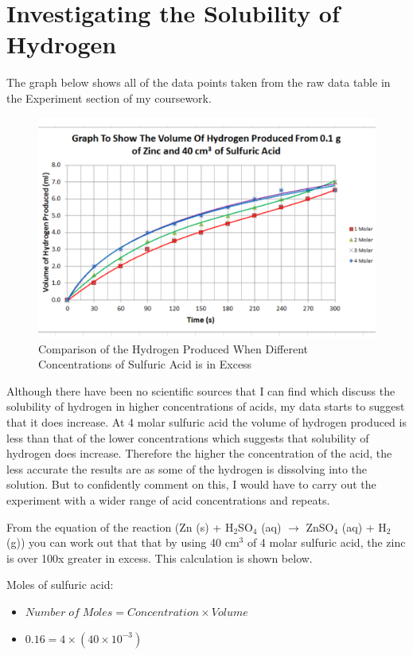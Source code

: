 \section{Investigating the Solubility of Hydrogen} 

The graph below shows all of the data points taken from the raw data table in the Experiment section of my coursework. 

\begin{figure}[H]
    \includegraphics[width=\textwidth]{./Analysis/Images/Solubility.pdf}
    \caption{Comparison of the Hydrogen Produced When Different Concentrations of Sulfuric Acid is in Excess} \label{fig:ComparisonCat}
\end{figure}

Although there have been no scientific sources that I can find which discuss the solubility of hydrogen in higher concentrations of acids, my data starts to suggest that it does increase. At 4 molar sulfuric acid the volume of hydrogen produced is less than that of the lower concentrations which suggests that solubility of hydrogen does increase. Therefore the higher the concentration of the acid, the less accurate the results are as some of the hydrogen is dissolving into the solution. But to confidently comment on this, I would have to carry out the experiment with a wider range of acid concentrations and repeats. 

From the equation of the reaction (Zn (s) + H$_2$SO$_4$ (aq) $\rightarrow$ ZnSO$_4$ (aq) + H$_2$ (g)) you can work out that that by using 40 cm$^3$ of 4 molar sulfuric acid, the zinc is over 100x greater in excess. This calculation is shown below.

Moles of sulfuric acid:
\begin{itemize}
\item $Number \; of \; Moles = Concentration \times Volume$
\item $0.16 = 4 \times (40 \times 10^{-3})$
\end{itemize}

